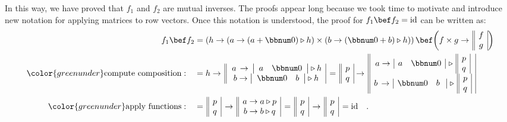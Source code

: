 In this way, we have proved that $f_{1}$ and $f_{2}$ are mutual
inverses. The proofs appear long because we took time to motivate
and introduce new notation for applying matrices to row vectors. Once
this notation is understood, the proof for $f_{1}\bef f_{2}=\text{id}$
can be written as:
\begin{align*}
f_{1}\bef f_{2} & =\left(h\rightarrow(a\rightarrow(a+\bbnum 0)\triangleright h)\times(b\rightarrow(\bbnum 0+b)\triangleright h)\right)\bef\bigg(f\times g\rightarrow\,\begin{array}{||c|}
f\\
g
\end{array}\bigg)\\
{\color{greenunder}\text{compute composition}:}\quad & =h\rightarrow\,\begin{array}{||c|}
\,a\,\rightarrow\,\left|\begin{array}{cc}
a & \bbnum 0\end{array}\right|\triangleright h\\
b\rightarrow\left|\begin{array}{cc}
\bbnum 0 & b\end{array}\right|\triangleright h
\end{array}\,=\,\begin{array}{||c|}
p\\
q
\end{array}\rightarrow\,\begin{array}{||c|}
a\rightarrow\,\begin{array}{|cc|}
a & \bbnum 0\end{array}\,\triangleright\,\begin{array}{||c|}
p\\
q
\end{array}\\
b\,\rightarrow\,\begin{array}{|cc|}
\bbnum 0 & b\,\,\end{array}\,\triangleright\,\begin{array}{||c|}
p\\
q
\end{array}
\end{array}\\
{\color{greenunder}\text{apply functions}:}\quad & =\,\begin{array}{||c|}
p\\
q
\end{array}\,\rightarrow\,\begin{array}{||c|}
a\rightarrow a\triangleright p\\
b\rightarrow b\triangleright q
\end{array}\,=\,\begin{array}{||c|}
p\\
q
\end{array}\,\rightarrow\,\begin{array}{||c|}
p\\
q
\end{array}\,=\text{id}\quad.
\end{align*}
